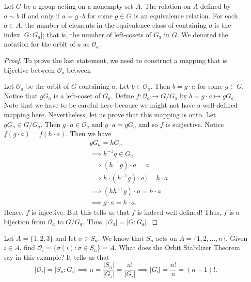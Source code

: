 \begin{prop}
    Let \( G  \) be a group acting on a nonempty set \( A  \). The relation on \( A  \) defined by \( a \sim b  \) if and only if \( a = g \cdot b  \) for some \( g \in G  \) is an equivalence relation. For each \( a \in A  \), the number of elements in the equivalence class of containing \( a  \) is the index \( | G : {G}_{a} |  \); that is, the number of left-cosets of \( {G}_{a} \) in \( G  \). We denoted the notation for the orbit of \( a  \) as \( \mathcal{O}_a \).    
\end{prop}
\begin{proof}
    To prove the last statement, we need to construct a mapping that is bijective between \( \mathcal{O}_a \) between  

    Let \( \mathcal{O}_a \) be the orbit of \( G  \) containing \( a  \). Let \( b  \in {\mathcal{O}}_{a} \). Then \( b = g \cdot a  \) for some \( g \in G  \). Notice that \( g {G}_{a}  \) is a left-coset of \( {G}_{a} \). Define \( f : {\mathcal{O}}_{a} \to G / {G}_{a} \) by \( b = g \cdot a \longmapsto g {G}_{a} \). Note that we have to be careful here because we might not have a well-defined mapping here. Nevertheless, let us prove that this mapping is onto. Let \( g {G}_{a} \in G / {G}_{a} \). Then \( g \cdot a \in {\mathcal{O}}_{a} \) and \( g \cdot  a  = g {G}_{a} \) and so \(  f \) is surjective. Notice \( f(g \cdot a) = f(h \cdot a) \). Then we have  
    \begin{align*}
        &g {G}_{a} = h {G}_{a} \\
                  &\implies h^{-1} g \in {G}_{a} \\
                  &\implies (h^{-1} g) \cdot a = a \\
                  &\implies h  \cdot (h^{-1} g) \cdot a ) = h \cdot a  \\
                  &\implies (h h^{-1} g ) \cdot a = h \cdot a \\ 
                  &\implies g \cdot a = h \cdot a.
    \end{align*}
    Hence, \( f  \) is injective. But this tells us that \( f  \) is indeed well-defined! Thus, \( f  \) is a bijection from \( {\mathcal{O}}_{a} \) to \( G / {G}_{a} \). Thus, \( | {\mathcal{O}}_{a}  |  = |  G : {G}_{a} |  \). 
\end{proof}

\begin{eg}
   Let \( A = \{ 1,2,3 \}  \) and let \( \sigma \in {S}_{n} \). We know that \( {S}_{n} \) acts on \( A = \{  1,2,\dots, n \}  \). Given \( i \in A  \), find \( {\mathcal{O}}_{i} = \{  \sigma(i) : \sigma \in {S}_{n} \} = A   \). What does the Orbit Stabilizer Theorem say in this example? It tells us that 
   \[  | {\mathcal{O}}_{i} | = | {S}_{n} : {G}_{i}  | \implies n = \frac{ | {S}_{n} |   }{  | {G}_{i} |   } = \frac{ n!  }{ | {G}_{i} |  } \implies | {G}_{i} | = \frac{ n!  }{  n  }  = (n-1)!.  \]
\end{eg}

